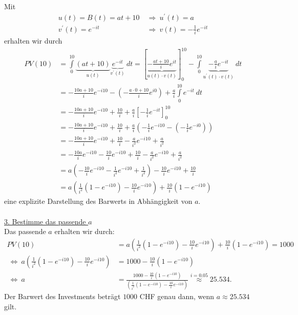 Mit
\begin{align*}
u(t) = B(t) = at + 10  \ &\Rightarrow \ u^\prime(t) = a\\
v^\prime(t) = e^{-it}  \ &\Rightarrow \ v(t) = -\frac{1}{i} e^{-it}
\end{align*}
erhalten wir durch
\begin{align*}
PV(10)
&=
\int \limits_0^{10} \underbrace{(at + 10)}_{u(t)} \underbrace{e^{-it }}_{v^\prime(t)} \ dt
=
\left[ \underbrace{-\frac{at +10}{i} e^{it}}_{u(t) \cdot v(t)} \right]_0^{10}
-
\int \limits_0^{10} \underbrace{-\frac{a}{i} e^{-it}}_{u^\prime(t) \cdot v(t)} \ dt\\
&=
- \frac{10 a + 10}{i}e^{-i10} 
- \left( -\frac{a \cdot 0 +10}{i} e^{i0}\right)
 + \frac{a}{i} \int \limits_0^{10}  e^{-it} \  dt\\
&=
- \frac{10 a + 10}{i}e^{-i10} +\frac{10}{i} +  \frac{a}{i} \left[ -\frac{1}{i} e^{-it}\right]_0^{10}\\
&=
- \frac{10 a + 10}{i}e^{-i10} +\frac{10}{i} + \frac{a}{i} \left(- \frac{1}{i} e^{-i10} - \left(-\frac{1}{i} e^{-i0}\right) \right)\\
&=
- \frac{10 a + 10}{i}e^{-i10} +\frac{10}{i} - \frac{a}{i^2} e^{-i10} +\frac{a}{i^2}\\
&=
- \frac{10 a }{i}e^{-i10} - \frac{ 10}{i}e^{-i10} +\frac{10}{i}  - \frac{a}{i^2} e^{-i10} +\frac{a}{i^2}\\
&=
a \left(- \frac{10}{i}e^{-i10} - \frac{1}{i^2}e^{-i10} + \frac{1}{i^2}  \right)  - \frac{10}{i} e^{-i10} + \frac{10}{i}\\
&=
a \left( \frac{1}{i^2} (1 - e^{-i10} )  - \frac{10}{i}e^{-i10} \right)
+
\frac{10}{i} (1 - e^{-i10})
\end{align*}
eine explizite Darstellung des Barwerts in Abhängigkeit von $ a $.\\
\\
\underline{3. Bestimme das passende $ a $}\\
Das passende $ a $ erhalten wir durch:
\begin{align*}
PV(10) &= a \left( \frac{1}{i^2} (1 - e^{-i10} )  - \frac{10}{i}e^{-i10} \right)
+
\frac{10}{i} (1 - e^{-i10}) = 1000\\
\ \Leftrightarrow \
a \left( \frac{1}{i^2} (1 - e^{-i10} )  - \frac{10}{i}e^{-i10} \right) &= 1000 - \frac{10}{i} (1 - e^{-i10})\\
\ \Leftrightarrow \
a &= 
\frac{1000 - \frac{10}{i} (1 - e^{-i10})}{\left( \frac{1}{i^2} (1 - e^{-i10} )  - \frac{10}{i}e^{-i10} \right)}
\overset{i = 0.05}{\approx } 25.534.
\end{align*}
Der Barwert des Investments beträgt $ 1000 $ CHF genau dann, wenn $ a \approx 25.534 $ gilt.
\newpage

